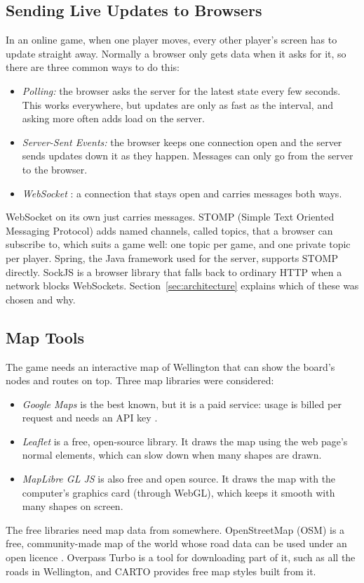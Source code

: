 \documentclass[lettersize,journal]{IEEEtran}
\begin{document}
\subsection{Sending Live Updates to Browsers}
In an online game, when one player moves, every other player's screen has to update straight away. Normally a browser only gets data when it asks for it, so there are three common ways to do this:
\begin{itemize}
	\item \emph{Polling:} the browser asks the server for the latest state every few seconds. This works everywhere, but updates are only as fast as the interval, and asking more often adds load on the server.
	\item \emph{Server-Sent Events:} the browser keeps one connection open and the server sends updates down it as they happen. Messages can only go from the server to the browser.
	\item \emph{WebSocket} \cite{rfc6455}: a connection that stays open and carries messages both ways.
\end{itemize}
WebSocket on its own just carries messages. STOMP (Simple Text Oriented Messaging Protocol) adds named channels, called topics, that a browser can subscribe to, which suits a game well: one topic per game, and one private topic per player. Spring, the Java framework used for the server, supports STOMP directly. SockJS is a browser library that falls back to ordinary HTTP when a network blocks WebSockets. Section~\ref{sec:architecture} explains which of these was chosen and why.

\subsection{Map Tools}
The game needs an interactive map of Wellington that can show the board's nodes and routes on top. Three map libraries were considered:
\begin{itemize}
	\item \emph{Google Maps} is the best known, but it is a paid service: usage is billed per request and needs an API key \cite{googlemaps_pricing}.
	\item \emph{Leaflet} is a free, open-source library. It draws the map using the web page's normal elements, which can slow down when many shapes are drawn.
	\item \emph{MapLibre GL JS} \cite{maplibre} is also free and open source. It draws the map with the computer's graphics card (through WebGL), which keeps it smooth with many shapes on screen.
\end{itemize}
The free libraries need map data from somewhere. OpenStreetMap (OSM) is a free, community-made map of the world whose road data can be used under an open licence \cite{osm}. Overpass Turbo is a tool for downloading part of it, such as all the roads in Wellington, and CARTO provides free map styles built from it.
\end{document}
